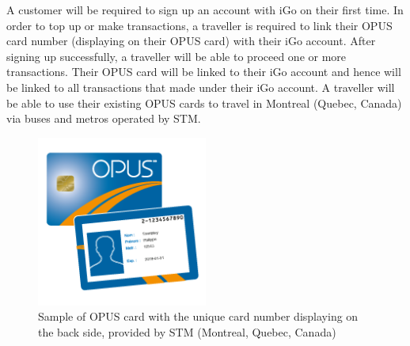 \documentclass[11pt, english]{article}
\begin{document}
A customer will be required to sign up an account with iGo on their first time. In order to top up or make transactions, a traveller is required to link their OPUS card number (displaying on their OPUS card)  with their iGo account. After signing up successfully, a traveller will be able to proceed one or more transactions. Their OPUS card will be linked to their iGo account and hence will be linked to all transactions that made under their iGo account. A traveller will be able to use their existing OPUS cards to travel in Montreal (Quebec, Canada) via buses and metros operated by STM. \\

\begin{figure}[h!]
  
  \includegraphics[width=0.5\textwidth]{opus.png}
  \centering
  \caption{Sample of OPUS card with the unique card number displaying on the back side, provided by STM (Montreal, Quebec, Canada)\cite{carte_opus}
}
\end{figure}
\end{document}
